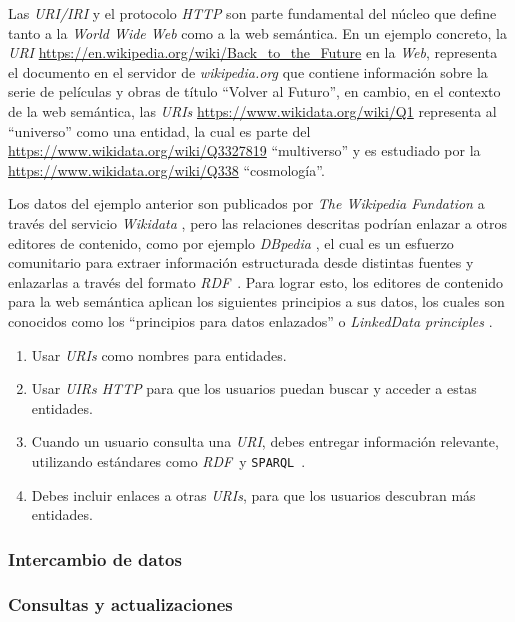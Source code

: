\documentclass[conference,compsoc]{IEEEtran}
\newcommand{\rdf}{\textit{RDF}\ }
\newcommand{\spql}{\texttt{SPARQL}\ }
\begin{document}
Las \textit{URI/IRI} y el protocolo \textit{HTTP} son parte fundamental del núcleo que define tanto a la
\textit{World Wide Web} como a la web semántica. En un ejemplo concreto, la \textit{URI}
\url{https://en.wikipedia.org/wiki/Back_to_the_Future} en la \textit{Web}, representa el documento en el
servidor de \textit{wikipedia.org} que contiene información sobre la serie de películas y obras de título
``Volver al Futuro'', en cambio, en el contexto de la web semántica, las \textit{URIs} \url{https://www.wikidata.org/wiki/Q1} representa al
``universo'' como una entidad, la cual es parte del \url{https://www.wikidata.org/wiki/Q3327819} ``multiverso''
y es estudiado por la \url{https://www.wikidata.org/wiki/Q338} ``cosmología''.

Los datos del ejemplo anterior son publicados por \textit{The Wikipedia Fundation} a través del servicio \textit{Wikidata}
\cite{vrandevcic2014wikidata}, pero las relaciones descritas podrían enlazar a otros editores de contenido,
como por ejemplo \textit{DBpedia} \cite{valsecchi2015dbpedia}, el cual es un esfuerzo comunitario para extraer
información estructurada desde distintas fuentes y enlazarlas a través del formato \rdf. Para lograr esto,
los editores de contenido para la web semántica aplican los siguientes principios a sus datos, los cuales
son conocidos como los ``principios para datos enlazados'' o \textit{LinkedData principles} \cite{bizer2011linked}.

\begin{enumerate}
    \item Usar \textit{URIs} como nombres para entidades.
    \item Usar \textit{UIRs HTTP} para que los usuarios puedan buscar y acceder a estas entidades.
    \item Cuando un usuario consulta una \textit{URI}, debes entregar información relevante, utilizando estándares como \rdf y \spql.
    \item Debes incluir enlaces a otras \textit{URIs}, para que los usuarios descubran más entidades.
\end{enumerate}

    \subsubsection{Intercambio de datos}

    \subsubsection{Consultas y actualizaciones}
\end{document}
